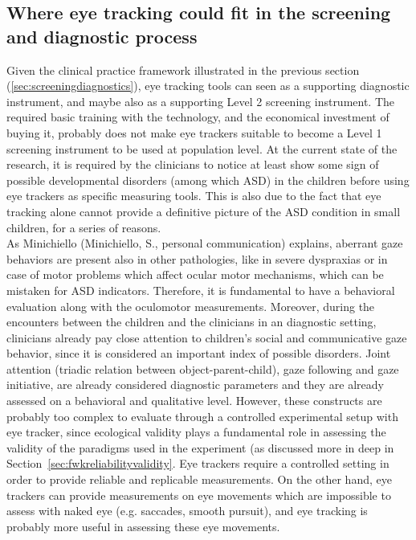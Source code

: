 \subsection{Where eye tracking could fit in the screening and diagnostic process}
\label{sec:eyetrackingdiagnosis}
Given the clinical practice framework illustrated in the previous section (\ref{sec:screeningdiagnostics}), eye tracking tools can seen as a supporting diagnostic instrument, and maybe also as a supporting Level 2 screening instrument. The required basic training with the technology, and the economical investment of buying it, probably does not make eye trackers suitable to become a Level 1 screening instrument to be used at population level. At the current state of the research, it is required by the clinicians to notice at least show some sign of possible developmental disorders (among which ASD) in the children before using eye trackers as specific measuring tools. This is also due to the fact that eye tracking alone cannot provide a definitive picture of the ASD condition in small children, for a series of reasons.\\
As Minichiello (Minichiello, S., personal communication) explains, aberrant gaze behaviors are present also in other pathologies, like in severe dyspraxias or in case of motor problems which affect ocular motor mechanisms, which can be mistaken for ASD indicators. Therefore, it is fundamental to have a behavioral evaluation along with the oculomotor measurements.
Moreover, during the encounters between the children and the clinicians in an diagnostic setting, clinicians already pay close attention to children’s social and communicative gaze behavior, since it is considered an important index of possible disorders. Joint attention (triadic relation between object-parent-child), gaze following and gaze initiative, are already considered diagnostic parameters and they are already assessed on a behavioral and qualitative level. However, these constructs are probably too complex to evaluate through a controlled experimental setup with eye tracker, since ecological validity plays a fundamental role in assessing the validity of the paradigms used in the experiment (as discussed more in deep in Section~\ref{sec:fwkreliabilityvalidity}. Eye trackers require a controlled setting in order to provide reliable and replicable measurements. On the other hand, eye trackers can provide measurements on eye movements which are impossible to assess with naked eye (e.g. saccades, smooth pursuit), and eye tracking is probably more useful in assessing these eye movements.\\
